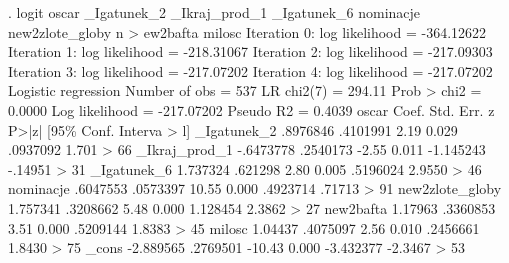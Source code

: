 . logit oscar _Igatunek_2 _Ikraj_prod_1 _Igatunek_6 nominacje new2zlote_globy n
> ew2bafta milosc
{\smallskip}
Iteration 0:   log likelihood = -364.12622  
Iteration 1:   log likelihood = -218.31067  
Iteration 2:   log likelihood = -217.09303  
Iteration 3:   log likelihood = -217.07202  
Iteration 4:   log likelihood = -217.07202  
{\smallskip}
Logistic regression                               Number of obs   =        537
                                                  LR chi2(7)      =     294.11
                                                  Prob > chi2     =     0.0000
Log likelihood = -217.07202                       Pseudo R2       =     0.4039
{\smallskip}
          oscar {\VBAR}      Coef.   Std. Err.      z    P>|z|     [95\% Conf. Interva
> l]
    _Igatunek_2 {\VBAR}   .8976846   .4101991     2.19   0.029     .0937092     1.701
> 66
  _Ikraj_prod_1 {\VBAR}  -.6473778   .2540173    -2.55   0.011    -1.145243   -.14951
> 31
    _Igatunek_6 {\VBAR}   1.737324    .621298     2.80   0.005     .5196024    2.9550
> 46
      nominacje {\VBAR}   .6047553   .0573397    10.55   0.000     .4923714    .71713
> 91
new2zlote_globy {\VBAR}   1.757341   .3208662     5.48   0.000     1.128454    2.3862
> 27
      new2bafta {\VBAR}    1.17963   .3360853     3.51   0.000     .5209144    1.8383
> 45
         milosc {\VBAR}    1.04437   .4075097     2.56   0.010     .2456661    1.8430
> 75
          _cons {\VBAR}  -2.889565   .2769501   -10.43   0.000    -3.432377   -2.3467
> 53
